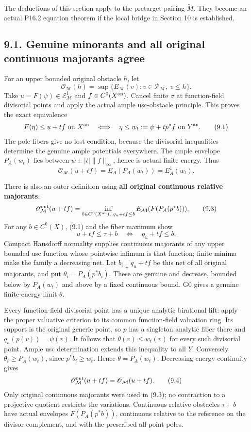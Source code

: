 \documentclass[
  10pt,
]{article}
\begin{document}
The deductions of this section apply to the pretarget pairing
\(\widetilde M\). They become an actual P16.2 equation theorem if the
local bridge in Section 10 is established.

\subsection{9.1. Genuine minorants and all original continuous majorants
agree}\label{genuine-minorants-and-all-original-continuous-majorants-agree}

For an upper bounded original obstacle \(h\), let
\[\mathscr O_{\mathcal M}(h)=\sup\{E_{\mathcal M}(v):v\in\mathcal P_{\mathcal M},\ v\leq h\}.\]
Take \(u=F(\psi)\in\mathcal E^1_{\mathcal M}\) and
\(f\in C^0(X^{\rm an})\). Cancel finite \(\sigma\) at function-field
divisorial points and apply the actual ample usc-obstacle principle.
This proves the exact equivalence
\[F(\eta)\leq u+tf\text{ on }X^{\rm an}\quad\Longleftrightarrow\quad
\eta\leq w_t:=\psi+t p^*f\text{ on }Y^{\rm an}.           \tag{9.1}\]
The pole fibers give no lost condition, because the divisorial
inequalities determine the genuine ample potentials everywhere. The
ample envelope \(P_A(w_t)\) lies between \(\psi\pm |t|\|f\|_\infty\),
hence is actual finite energy. Thus
\[\mathscr O_{\mathcal M}(u+tf)=E_A(P_A(w_t))=E_A^\downarrow(w_t). \tag{9.2}\]

There is also an outer definition using \textbf{all original continuous
relative majorants}: \[\mathscr O^{\rm out}_{\mathcal M}(u+tf)
=\inf_{b\in C^0(X^{\rm an}),\ q_u+tf\leq b}
E_{\mathcal M}(F(P_A(p^*b))).                            \tag{9.3}\] For
any \(b\in C^0(X)\), (9.1) and the fiber maximum show
\[u+tf\leq\tau+b\quad\Longleftrightarrow\quad q_u+tf\leq b.\] Compact
Hausdorff normality supplies continuous majorants of any upper bounded
usc function whose pointwise infimum is that function; finite minima
make the family a decreasing net. Let \(b_i\downarrow q_u+tf\) be this
net of all original majorants, and put \(\theta_i=P_A(p^*b_i)\). These
are genuine and decrease, bounded below by \(P_A(w_t)\) and above by a
fixed continuous bound. G0 gives a genuine finite-energy limit
\(\theta\).

Every function-field divisorial point has a unique analytic birational
lift: apply the proper valuative criterion to its common function-field
valuation ring. Its support is the original generic point, so \(p\) has
a singleton analytic fiber there and \(q_u(p(v))=\psi(v)\). It follows
that \(\theta(v)\leq w_t(v)\) for every such divisorial point. Ample usc
determination extends this inequality to all \(Y\). Conversely
\(\theta_i\geq P_A(w_t)\), since \(p^*b_i\geq w_t\). Hence
\(\theta=P_A(w_t)\). Decreasing energy continuity gives
\[\mathscr O^{\rm out}_{\mathcal M}(u+tf)=\mathscr O_{\mathcal M}(u+tf). \tag{9.4}\]
Only original continuous majorants were used in (9.3); no contraction to
a projective quotient restricts the variations. Continuous relative
obstacles \(\tau+b\) have actual envelopes \(F(P_A(p^*b))\), continuous
relative to the reference on the divisor complement, and with the
prescribed all-point poles.
\end{document}
